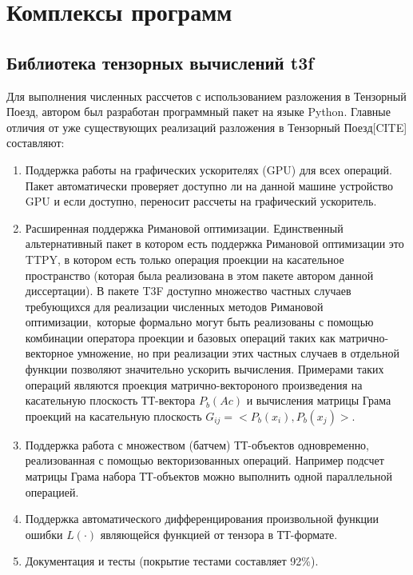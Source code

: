 \chapter{Комплексы программ} \label{chap:exm}
\section{Библиотека тензорных вычислений t3f} \label{sec:t3f}
Для выполнения численных рассчетов с использованием разложения в Тензорный Поезд, автором был разработан программный пакет на языке Python. Главные отличия от уже существующих реализаций разложения в Тензорный Поезд[CITE] составляют:
\begin{enumerate}
	\item Поддержка работы на графических ускорителях (GPU) для всех операций. Пакет автоматически проверяет доступно ли на данной машине устройство GPU и если доступно, переносит рассчеты на графический ускоритель.
	\item Расширенная поддержка Римановой оптимизации. Единственный альтернативный пакет в котором есть поддержка Римановой оптимизации это TTPY, в котором есть только операция проекции на касательное пространство (которая была реализована в этом пакете автором данной диссертации). В пакете T3F доступно множество частных случаев требующихся для реализации численных методов Римановой оптимизации, которые формально могут быть реализованы с помощью комбинации оператора проекции и базовых операций таких как матрично-векторное умножение, но при реализации этих частных случаев в отдельной функции позволяют значительно ускорить вычисления. Примерами таких операций являются проекция матрично-вектороного произведения на касательную плоскость ТТ-вектора $P_b(A c)$ и вычисления матрицы Грама проекций на касательную плоскость $G_{ij} = <P_b(x_i), P_b(x_j)>$.
	\item Поддержка работа с множеством (батчем) ТТ-объектов одновременно, реализованная с помощью векторизованных операций. Например подсчет матрицы Грама набора ТТ-объектов можно выполнить одной параллельной операцией.
	\item Поддержка автоматического дифференцирования произвольной функции ошибки $L(\cdot)$ являющейся функцией от тензора в ТТ-формате.
	\item Документация и тесты (покрытие тестами составляет 92\%).
\end{enumerate}

